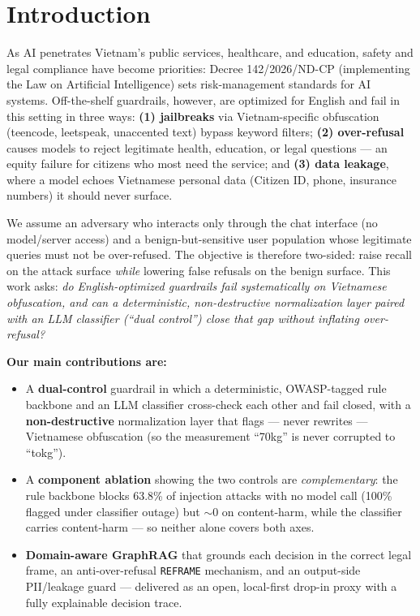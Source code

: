 \documentclass[11pt, a4paper]{article}
\begin{document}
\section{Introduction}
As AI penetrates Vietnam's public services, healthcare, and education, safety and legal compliance have become priorities: Decree 142/2026/ND-CP (implementing the Law on Artificial Intelligence) sets risk-management standards for AI systems. Off-the-shelf guardrails, however, are optimized for English and fail in this setting in three ways: \textbf{(1) jailbreaks} via Vietnam-specific obfuscation (teencode, leetspeak, unaccented text) bypass keyword filters; \textbf{(2) over-refusal} causes models to reject legitimate health, education, or legal questions --- an equity failure for citizens who most need the service; and \textbf{(3) data leakage}, where a model echoes Vietnamese personal data (Citizen ID, phone, insurance numbers) it should never surface.

We assume an adversary who interacts only through the chat interface (no model/server access) and a benign-but-sensitive user population whose legitimate queries must not be over-refused. The objective is therefore two-sided: raise recall on the attack surface \emph{while} lowering false refusals on the benign surface. This work asks: \emph{do English-optimized guardrails fail systematically on Vietnamese obfuscation, and can a deterministic, non-destructive normalization layer paired with an LLM classifier (``dual control'') close that gap without inflating over-refusal?}

\noindent\textbf{Our main contributions are:}
\begin{itemize}
    \item A \textbf{dual-control} guardrail in which a deterministic, OWASP-tagged rule backbone and an LLM classifier cross-check each other and fail closed, with a \textbf{non-destructive} normalization layer that flags --- never rewrites --- Vietnamese obfuscation (so the measurement ``70kg'' is never corrupted to ``tokg'').
    \item A \textbf{component ablation} showing the two controls are \emph{complementary}: the rule backbone blocks 63.8\% of injection attacks with no model call (100\% flagged under classifier outage) but $\sim$0 on content-harm, while the classifier carries content-harm --- so neither alone covers both axes.
    \item \textbf{Domain-aware GraphRAG} that grounds each decision in the correct legal frame, an anti-over-refusal \texttt{REFRAME} mechanism, and an output-side PII/leakage guard --- delivered as an open, local-first drop-in proxy with a fully explainable decision trace.
\end{itemize}
\end{document}
